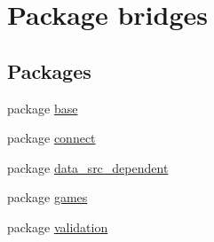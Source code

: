 \hypertarget{namespacebridges}{}\section{Package bridges}
\label{namespacebridges}
\subsection*{Packages}
\begin{DoxyCompactItemize}
\item 
package \mbox{\hyperlink{namespacebridges_1_1base}{base}}
\item 
package \mbox{\hyperlink{namespacebridges_1_1connect}{connect}}
\item 
package \mbox{\hyperlink{namespacebridges_1_1data__src__dependent}{data\+\_\+src\+\_\+dependent}}
\item 
package \mbox{\hyperlink{namespacebridges_1_1games}{games}}
\item 
package \mbox{\hyperlink{namespacebridges_1_1validation}{validation}}
\end{DoxyCompactItemize}
